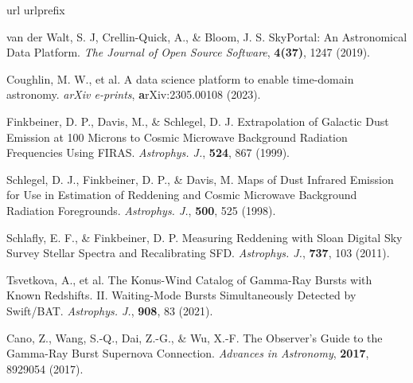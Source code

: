 \documentclass{nature_plusfigure}
\newcommand{\apj}{{Astrophys. J.}}
\begin{document}
\begin{methods}
\vspace{1in}
%
%

\begin{thebibliography}{10}
\expandafter\ifx\csname url\endcsname\relax
  \def\url#1{\texttt{#1}}\fi
\expandafter\ifx\csname urlprefix\endcsname\relax\def\urlprefix{URL }\fi
\providecommand{\bibinfo}[2]{#2}
\providecommand{\eprint}[2][]{\url{#2}}
\makeatletter
\addtocounter{\@listctr}{74}
\makeatother



  van der Walt, S. J, Crellin-Quick, A., \& Bloom, J. S. SkyPortal: An Astronomical Data Platform. \emph{The Journal of Open Source Software}, \textbf{4(37)}, 1247 (2019). 

  Coughlin, M. W., et al. A data science platform to enable time-domain astronomy. \emph{arXiv e-prints}, \textbf arXiv:2305.00108 (2023). 


  Finkbeiner, D. P., Davis, M., \& Schlegel, D. J. Extrapolation of Galactic Dust Emission at 100 Microns to Cosmic Microwave Background Radiation Frequencies Using FIRAS. \emph{\apj}, \textbf{524}, 867 (1999). 
 
  Schlegel, D. J., Finkbeiner, D. P., \& Davis, M. Maps of Dust Infrared Emission for Use in Estimation of Reddening and Cosmic Microwave Background Radiation Foregrounds. \emph{\apj}, \textbf{500}, 525 (1998). 

  Schlafly, E. F., \& Finkbeiner, D. P. Measuring Reddening with Sloan Digital Sky Survey Stellar Spectra and Recalibrating SFD. \emph{\apj}, \textbf{737}, 103 (2011). 
 

 Tsvetkova, A., et al. The Konus-Wind Catalog of Gamma-Ray Bursts with Known Redshifts. II. Waiting-Mode Bursts Simultaneously Detected by Swift/BAT. \emph{\apj}, \textbf{908}, 83 (2021). 

 Cano, Z., Wang, S.-Q., Dai, Z.-G., \& Wu, X.-F. The Observer's Guide to the Gamma-Ray Burst Supernova Connection. \emph{Advances in Astronomy}, \textbf{2017}, 8929054 (2017). 
 

\end{thebibliography}
\end{methods}
\end{document}
